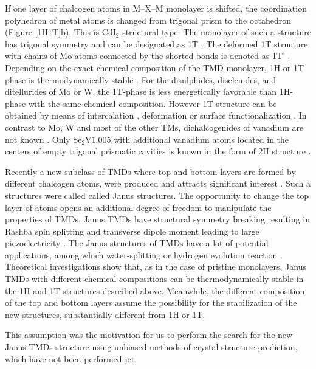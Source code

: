 \documentclass[a4paperm]{article}
\begin{document}
If one layer of chalcogen atoms in M--X--M monolayer is shifted, the coordination polyhedron of metal atoms is changed from trigonal prism to the octahedron (Figure \ref{1H1T}b).
This is CdI$_2$ structural type. 
The monolayer of such a structure has trigonal symmetry and can be designated as 1T \cite{huang2020recent}. 
The deformed 1T structure with chains of Mo atoms connected by the shorted bonds is denoted as 1T' \cite{huang2020recent}.
Depending on the exact chemical composition of the TMD monolayer, 1H or 1T phase is thermodynamically stable \cite{ataca2012stable}. 
For the disulphides, diselenides, and ditellurides of Mo or W, the  1T-phase is less energetically favorable than 1H-phase with the same chemical composition. 
However 1T structure can be obtained by means of intercalation \cite{kan2014structures, wang2014atomic}, deformation \cite{duerloo2014structural} or surface functionalization \cite{tang2015stabilization, voiry2015covalent}. 
In contrast to Mo, W and most of the other TMs, dichalcogenides of vanadium are not known \cite{murphy1977preparation, le1979elaboration}. 
Only Se$_2$V$1.005$ with additional vanadium atoms located in the centers of empty trigonal prismatic cavities is known in the form of 2H structure \cite{rigoult1982}.

Recently a new subclass of TMDs where top and bottom layers are formed by different chalcogen atoms, were produced and attracts significant interest \cite{lu2017, zhang2017janus}. 
Such a structures were called called Janus structures.
The opportunity to change the top layer of atoms opens an additional degree of freedom to manipulate the properties of TMDs. 
Janus TMDs have structural symmetry breaking \cite{li2017electronic, van2020first} resulting in Rashba spin splitting \cite{hu2018intrinsic} and transverse dipole moment leading to large piezoelectricity \cite{dong2017large, li2018recent}. 
The Janus structures of TMDs have a lot of potential applications, among which water-splitting \cite{xia2018universality, ma2018janus} or hydrogen evolution reaction \cite{er2018prediction, zhou2019janus}. 
Theoretical investigations show that, as in the case of pristine monolayers, Janus TMDs with different chemical compositions can be thermodynamically stable in the 1H and 1T structures desrcibed above.
Meanwhile, the different composition of the top and bottom layers assume the possibility for the stabilization of the new structures, substantially different from 1H or 1T.

This assumption was the motivation for us to perform the search for the new Janus TMDs structure using unbiased methods of crystal structure prediction, which have not been performed jet.
\end{document}
